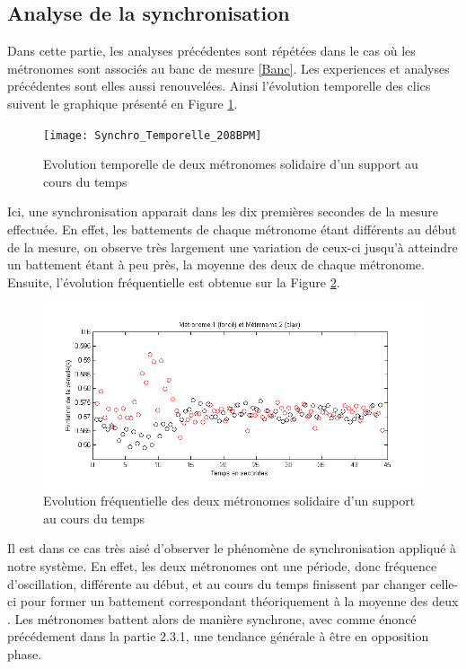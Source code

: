 \documentclass[a4paper,11pt]{report}
\begin{document}
\subsection{Analyse de la synchronisation}
Dans cette partie, les analyses précédentes sont répétées dans le cas où les métronomes sont associés au banc de mesure \ref{Banc}. Les experiences et analyses précédentes sont elles aussi renouvelées. Ainsi l'évolution temporelle des clics suivent le graphique présenté en Figure \ref{SynchronisationT}.
\begin{figure}[h]
\centering
\texttt{[image: Synchro\_Temporelle\_208BPM]}
\caption{Evolution temporelle de deux métronomes solidaire d'un support au cours du temps}\label{SynchronisationT}
\end{figure}
Ici, une synchronisation apparait dans les dix premières secondes de la mesure effectuée. En effet, les battements de chaque métronome étant différents au début de la mesure, on observe très largement une variation de ceux-ci jusqu'à atteindre un battement étant à peu près, la moyenne des deux de chaque métronome. Ensuite, l'évolution fréquentielle est obtenue sur la Figure \ref{SynchronisationF}.
\begin{figure}[!h]
\centering
\includegraphics[width=1\textwidth]{Synchro_Frequence_208BPM}
\caption{Evolution fréquentielle des deux métronomes solidaire d'un support au cours du temps}\label{SynchronisationF}
\end{figure}
Il est dans ce cas très aisé d'observer le phénomène de synchronisation appliqué à notre système. En effet, les deux métronomes ont une période, donc fréquence d'oscillation, différente au début, et au cours du temps finissent par changer celle-ci pour former un battement correspondant théoriquement à la moyenne des deux \cite{piko}. Les métronomes battent alors de manière synchrone, avec comme énoncé précédement dans la partie 2.3.1, une tendance générale à être en opposition phase.
\end{document}

